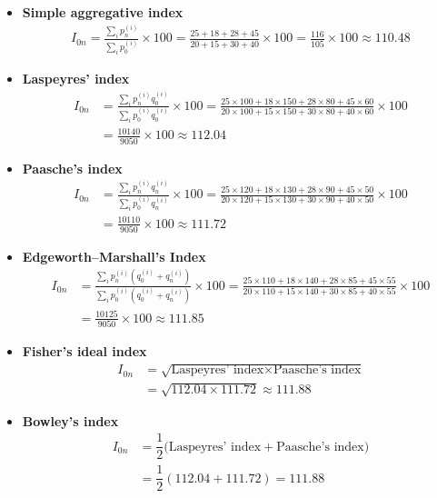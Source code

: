 \documentclass[twoside]{book}
\begin{document}
\begin{itemize}
\item \textbf{Simple aggregative index}
\begin{align*}
I_{0n} = \frac{\displaystyle\sum_i p_n^{(i)}}{\displaystyle\sum_i p_0^{(i)}} \times 100
= \frac{25 + 18 + 28 + 45}{20 + 15 + 30 + 40} \times 100
= \frac{116}{105} \times 100 \approx 110.48
\end{align*}

\item \textbf{Laspeyres' index}
\begin{align*}
I_{0n} &= \frac{\displaystyle\sum_i p_n^{(i)} q_0^{(i)}}{\displaystyle\sum_i p_0^{(i)} q_0^{(i)}} \times 100
= \frac{25\times100 + 18\times150 + 28\times80 + 45\times60}{20\times100 + 15\times150 + 30\times80 + 40\times60} \times 100 \\
&= \frac{10140}{9050} \times 100 \approx 112.04
\end{align*}

\item \textbf{Paasche's index}
\begin{align*}
I_{0n} &= \frac{\displaystyle\sum_i p_n^{(i)} q_n^{(i)}}{\displaystyle\sum_i p_0^{(i)} q_n^{(i)}} \times 100
= \frac{25\times120 + 18\times130 + 28\times90 + 45\times50}{20\times120 + 15\times130 + 30\times90 + 40\times50} \times 100 \\
&= \frac{10110}{9050} \times 100 \approx 111.72
\end{align*}

\item \textbf{Edgeworth--Marshall's Index}
\begin{align*}
I_{0n} &= \frac{\displaystyle\sum_i p_n^{(i)} (q_0^{(i)} + q_n^{(i)})}{\displaystyle\sum_i p_0^{(i)} (q_0^{(i)} + q_n^{(i)})} \times 100
= \frac{25\times110 + 18\times140 + 28\times85 + 45\times55}{20\times110 + 15\times140 + 30\times85 + 40\times55} \times 100 \\
&= \frac{10125}{9050} \times 100 \approx 111.85
\end{align*}

\item \textbf{Fisher's ideal index}
\begin{align*}
I_{0n} &= \sqrt{\text{Laspeyres' index} \times \text{Paasche's index}} \\
&= \sqrt{112.04 \times 111.72} \approx 111.88
\end{align*}

\item \textbf{Bowley's index}
\begin{align*}
I_{0n} &= \dfrac{1}{2}\bigl(\text{Laspeyres' index} + \text{Paasche's index}\bigr) \\
&= \dfrac{1}{2}(112.04 + 111.72) = 111.88
\end{align*}


\end{itemize}
\end{document}
